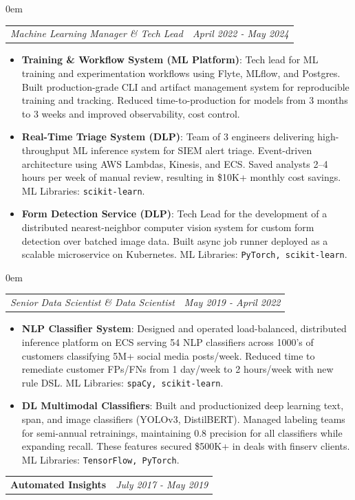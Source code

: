 \documentclass[letterpaper,11pt]{article}
\makeatletter
\newcommand{\resumeItem}[2]{
	\item\small{
		\textbf{#1}{: #2}
	}
}
\newcommand{\mllibs}[1]{\texttt{\small #1}}
\newcommand{\resumeJobWithDate}[3]{
	\begin{tabular*}{0.97\textwidth}{l@{\extracolsep{\fill}}r}
		\textbf{#1} & \textit{#2} \\
	\end{tabular*}
}
\newcommand{\resumeSubSubheading}[2]{
	\begin{addmargin}[1em]{0em}
		\begin{tabular*}{0.97\textwidth}{l@{\extracolsep{\fill}}r}
			\textit{#1} & \textit{\small #2} \\
		\end{tabular*}
	\end{addmargin}
}
\newcommand{\resumeItemListStart}{\begin{itemize}[itemsep=2pt, topsep=3pt]}
\newcommand{\resumeItemListEnd}{\end{itemize}}
\makeatother
\begin{document}
	\vspace{4pt}
	
	\resumeSubSubheading{Machine Learning Manager \& Tech Lead}{April 2022 - May 2024}
	\resumeItemListStart
	
	\resumeItem{Training \& Workflow System (ML Platform)}
	{Tech lead for ML training and experimentation workflows using Flyte, MLflow, and Postgres. Built production-grade CLI and artifact management system for reproducible training and tracking. Reduced time-to-production for models from 3 months to 3 weeks and improved observability, cost control.}
	
	\resumeItem{Real-Time Triage System (DLP)}
	{Team of 3 engineers delivering high-throughput ML inference system for SIEM alert triage. Event-driven architecture using AWS Lambdas, Kinesis, and ECS. Saved analysts 2--4 hours per week of manual review, resulting in \$10K+ monthly cost savings. ML Libraries: \mllibs{scikit-learn}.}
	
	\resumeItem{Form Detection Service (DLP)}
	{Tech Lead for the development of a distributed nearest-neighbor computer vision system for custom form detection over batched image data. Built async job runner deployed as a scalable microservice on Kubernetes. ML Libraries: \mllibs{PyTorch, scikit-learn}.}
	
	\resumeItemListEnd
	
	\vspace{4pt}
	
	\resumeSubSubheading{Senior Data Scientist \& Data Scientist}{May 2019 - April 2022}
	\resumeItemListStart
	
	\resumeItem{NLP Classifier System}
	{Designed and operated load-balanced, distributed inference platform on ECS serving 54 NLP classifiers across 1000's of customers classifying 5M+ social media posts/week. Reduced time to remediate customer FPs/FNs from 1 day/week to 2 hours/week with new rule DSL. ML Libraries: \mllibs{spaCy, scikit-learn}.}
	
	\resumeItem{DL Multimodal Classifiers}
	{Built and productionized deep learning text, span, and image classifiers (YOLOv3, DistilBERT). Managed labeling teams for semi-annual retrainings, maintaining 0.8 precision for all classifiers while expanding recall. These features secured \$500K+ in deals with finserv clients. ML Libraries: \mllibs{TensorFlow, PyTorch}.}
	
	\resumeItemListEnd
	
	\resumeJobWithDate{Automated Insights}{July 2017 - May 2019}{}
	\vspace{1pt}
	
\end{document}
